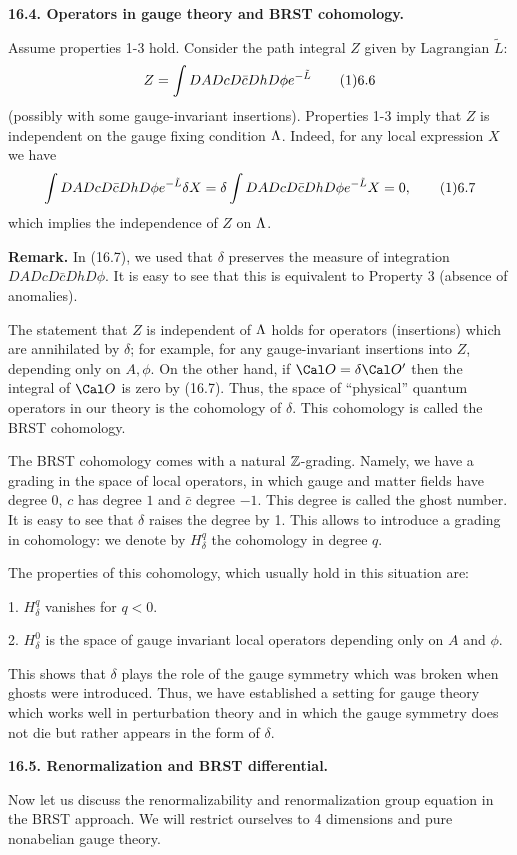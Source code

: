 {\bf 16.4. Operators in gauge theory and BRST cohomology.} 

Assume properties 1-3 hold. Consider the path integral $Z$ given by 
Lagrangian $\tilde L$:  
$$
Z=\int DADcD\bar c Dh D\phi e^{-\tilde L}\tag 16.6
$$
(possibly with some gauge-invariant insertions). 
Properties 1-3 imply that $Z$ is independent 
on the gauge fixing condition $\Lambda$. Indeed, for any local expression $X$ 
we have 
$$
\int 
DADcD\bar c DhD\phi e^{-\tilde L}\delta X=\delta \int DADcD\bar c DhD\phi
e^{-\tilde L}X=0,
\tag 16.7
$$
which implies the independence of $Z$ on $\Lambda$.

{\bf Remark.} In (16.7), we used that $\delta$ preserves the measure 
of integration $DADcD\bar c DhD\phi$. 
It is easy to see that this is equivalent to Property 3 (absence of 
anomalies).
 
The statement that $Z$ is independent of $\Lambda$ holds for 
operators (insertions) 
which are annihilated by $\delta$; for example, for any gauge-invariant 
insertions into $Z$, depending only on $A,\phi$.   
On the other hand, if $\O=\delta\O'$ then the integral of $\O$ is zero 
by (16.7). Thus, the space of ``physical'' 
quantum operators in our theory is the cohomology 
of $\delta$. This cohomology is called the BRST cohomology. 

The BRST cohomology comes with a natural $\Bbb Z$-grading. Namely, 
we have a grading in the space of local operators, 
in which gauge and matter fields have degree $0$, $c$ has degree 
$1$ and $\bar c$ degree $-1$. This degree is called the ghost number. 
It is easy to see that $\delta$ raises 
the degree by 1. This allows to introduce a grading in cohomology:
we denote by $H_\delta^q$ the cohomology in degree $q$. 

The  properties of this cohomology, 
which usually hold in this situation are: 

1. $H_\delta^q$ vanishes for $q<0$.

2. $H_\delta^0$ is the space of gauge invariant local operators
depending only on $A$ and $\phi$.

This shows that $\delta$ plays the role of the gauge symmetry 
which was broken when ghosts were introduced. Thus, we have established 
a setting for gauge theory which works well in perturbation theory 
and in which the gauge symmetry does not die but rather 
appears in the form of $\delta$. 

{\bf 16.5. Renormalization and BRST differential.}

Now let us discuss the renormalizability and renormalization group equation 
in the BRST approach. We will restrict ourselves to 4 dimensions and pure 
nonabelian gauge theory. 

